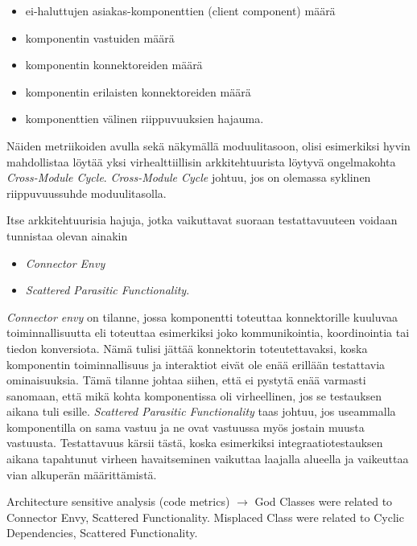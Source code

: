 \documentclass[finnish]{tktltiki2}
\theoremstyle{definition}
\theoremstyle{remark}
\begin{document}
\begin{itemize}
	\item ei-haluttujen asiakas-komponenttien (client component) määrä
	\item komponentin vastuiden määrä
	\item komponentin konnektoreiden määrä
	\item komponentin erilaisten konnektoreiden määrä
	\item komponenttien välinen riippuvuuksien hajauma.
\end{itemize}


\noindent
Näiden metriikoiden avulla sekä näkymällä moduulitasoon, olisi esimerkiksi hyvin mahdollistaa löytää yksi virhealttiillisin arkkitehtuurista löytyvä ongelmakohta \citep[s. 57]{HotSpot} \textit{Cross-Module Cycle}. \textit{Cross-Module Cycle} johtuu, jos on olemassa syklinen riippuvuussuhde moduulitasolla.


Itse arkkitehtuurisia hajuja, jotka vaikuttavat suoraan testattavuuteen voidaan tunnistaa olevan ainakin \citep{garcia_identifying_2009}

\begin{itemize}
	\item \textit{Connector Envy}
	\item \textit{Scattered Parasitic Functionality}.
\end{itemize}

\noindent
\textit{Connector envy} on tilanne, jossa komponentti toteuttaa konnektorille kuuluvaa toiminnallisuutta eli toteuttaa esimerkiksi joko kommunikointia, koordinointia tai tiedon konversiota. Nämä tulisi jättää konnektorin toteutettavaksi, koska komponentin toiminnallisuus ja interaktiot eivät ole enää erillään testattavia ominaisuuksia. Tämä tilanne johtaa siihen, että ei pystytä enää varmasti sanomaan, että mikä kohta komponentissa oli virheellinen, jos se testauksen aikana tuli esille. \textit{Scattered Parasitic Functionality} taas johtuu, jos useammalla komponentilla on sama vastuu ja ne ovat vastuussa myös jostain muusta vastuusta. Testattavuus kärsii tästä, koska esimerkiksi integraatiotestauksen aikana tapahtunut virheen havaitseminen vaikuttaa laajalla alueella ja vaikeuttaa vian alkuperän määrittämistä. 


Architecture sensitive analysis (code metrics) \citep[s. 185]{macia_enhancing_2013} $\rightarrow$ God Classes were related to Connector Envy, Scattered Functionality. Misplaced Class were related to Cyclic Dependencies, Scattered Functionality.
\end{document}
